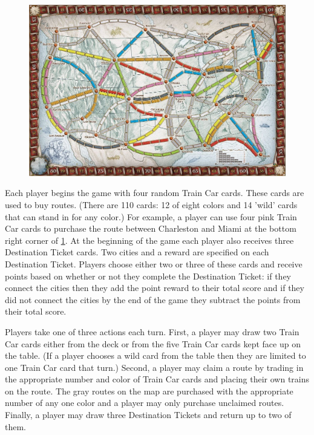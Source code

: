 \begin{figure}[h]
\centering
\includegraphics[scale=.4]{figures/board}
\label{fig:board}
\end{figure}

Each player begins the game with four random Train Car cards.
These cards are used to buy routes.
(There are 110 cards: 12 of eight colors and 14 'wild' cards
that can stand in for any color.)
For example, a player can use four pink Train Car cards to purchase
the route between Charleston and Miami
at the bottom right corner of \cref{fig:board}.
At the beginning of the game 
each player also receives three Destination Ticket cards.
Two cities and a reward are specified on each Destination Ticket.
Players choose either two or three of these cards and
receive points based on whether
or not they complete the Destination Ticket:
if they connect the cities then they add the point reward to their
total score and
if they did not connect the cities by the end of the game they
subtract the points from their total score.

Players take one of three actions each turn.
First, a player may draw two Train Car cards either
from the deck or from the five Train Car cards
kept face up on the table. 
(If a player chooses a wild card from the table
then they are limited to one Train Car card that turn.)
Second, a player may claim a route by trading in
the appropriate number and color of Train Car cards
and placing their own trains on the route.
The gray routes on the map are purchased with
the appropriate number of any one color
and a player may only purchase unclaimed routes.
Finally, a player may draw three Destination Tickets
and return up to two of them.

